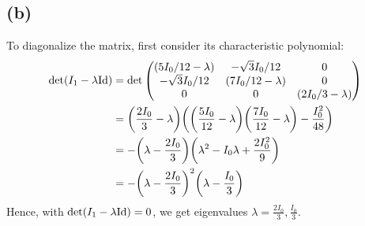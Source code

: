 \documentclass{article}
\newcommand{\Id}{\textmd{Id}} %
\DeclarePairedDelimiter{\paran}{(}{)}%
\begin{document}
\subsection*{(b)}
To diagonalize the matrix, first consider its characteristic polynomial:
\begin{align}
    \det(I_1-\lambda \Id) &= \det\begin{pmatrix}
        (5I_0/12-\lambda)&-\sqrt{3}I_0/12&0\\
        -\sqrt{3}I_0/12&(7I_0/12-\lambda)&0\\
        0&0&(2I_0/3-\lambda) 
    \end{pmatrix}\\
    &= \paran*{\frac{2I_0}{3}-\lambda}\paran*{\paran*{\frac{5I_0}{12}-\lambda}\paran*{\frac{7I_0}{12}-\lambda}-\frac{I_0^2}{48}}\\
    &= -\paran*{\lambda-\frac{2I_0}{3}}\paran*{\lambda^2-I_0\lambda+\frac{2I_0^2}{9}}\\
    &= -\paran*{\lambda-\frac{2I_0}{3}}^2\paran*{\lambda-\frac{I_0}{3}}
\end{align}
Hence, with $\det(I_1-\lambda\Id)=0$, we get eigenvalues $\lambda=\frac{2I_0}{3},\frac{I_0}{3}$.
\end{document}
